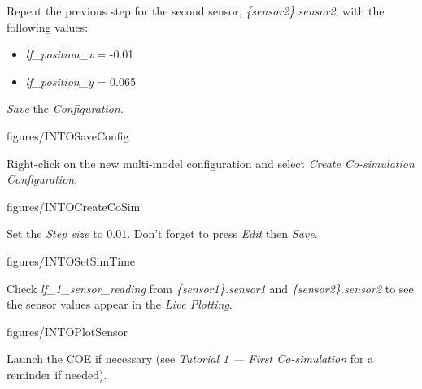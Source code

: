 \documentclass[11pt,a4paper]{../tutorial}
\begin{document}
\begin{instructions}
\item Repeat the previous step for the second sensor, \emph{\{sensor2\}.sensor2}, with the following values:

    \begin{itemize}
        \item \emph{lf\_position\_x} = -0.01
        \item \emph{lf\_position\_y} = 0.065
    \end{itemize}

\item \emph{Save} the \emph{Configuration}.

    \begin{annotation}[width=0.85\linewidth,trim=0 0 0 250,clip]{figures/INTOSaveConfig}
    \end{annotation}

\item Right-click on the new multi-model configuration and select \emph{Create Co-simulation Configuration}.

    \begin{annotation}[width=0.85\linewidth,trim=0 120 0 130,clip]{figures/INTOCreateCoSim}
    \end{annotation}

\item Set the \emph{Step size} to 0.01. Don't forget to press \emph{Edit} then \emph{Save}.

    \begin{annotation}[width=0.85\linewidth,trim=0 0 0 0,clip]{figures/INTOSetSimTime}
    \end{annotation}

\item Check \emph{lf\_1\_sensor\_reading} from \emph{\{sensor1\}.sensor1} and \emph{\{sensor2\}.sensor2} to see the sensor values appear in the \emph{Live Plotting}.

    \begin{annotation}[width=0.85\linewidth,trim=0 230 0 250,clip]{figures/INTOPlotSensor}
    \end{annotation}

\item Launch the COE if necessary (see \emph{Tutorial 1 --- First Co-simulation} for a reminder if needed).


\end{instructions}
\end{document}
